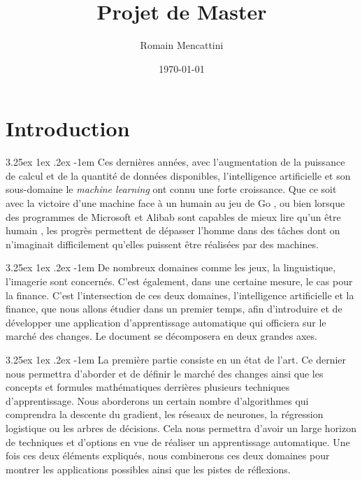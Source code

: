 \documentclass[a4paper, 11pt]{article}
\title{Projet de Master}
\author{Romain Mencattini}
\date{\today}
\makeatletter
\renewcommand\paragraph{\@startsection{paragraph}{5}{\z@}%
  {3.25ex \@plus1ex \@minus.2ex}%
  {-1em}%
  {\normalfont\normalsize\bfseries}}
\makeatother
\begin{document}
\maketitle
\newpage
\tableofcontents
\newpage

\section{Introduction}
\paragraph{}
Ces dernières années, avec l'augmentation de la puissance de calcul et de la quantité de données disponibles, l'intelligence artificielle et son sous-domaine le \textit{machine learning} ont connu une forte croissance. Que ce soit avec la victoire d'une machine face à un humain au jeu de Go \cite{deepmind}, ou bien lorsque des programmes de Microsoft et Alibab sont capables de mieux lire qu'un être humain \cite{microsoft_reading}, les progrès permettent de dépasser l'homme dans des tâches dont on n'imaginait difficilement qu'elles puissent être réalisées par des machines.

\paragraph{}
De nombreux domaines comme les jeux, la linguistique, l'imagerie sont concernés. C'est également, dans une certaine mesure, le cas pour la finance.
C'est l'intersection de ces deux domaines, l'intelligence artificielle et la finance, que nous allons étudier dans un premier temps, afin d'introduire et de développer une application d'apprentissage automatique qui officiera sur le marché des changes.
Le document se décomposera en deux grandes axes. 

\paragraph{}
La première partie consiste en un état de l'art. Ce dernier nous permettra d'aborder et de définir le marché des changes ainsi que les concepts et formules mathématiques derrières plusieurs techniques d'apprentissage. Nous aborderons un certain nombre d'algorithmes qui comprendra la descente du gradient, les réseaux de neurones, la régression logistique ou les arbres de décisions. Cela nous permettra d'avoir un large horizon de techniques et d'options en vue de réaliser un apprentissage automatique. Une fois ces deux éléments expliqués, nous combinerons ces deux domaines pour montrer les applications possibles ainsi que les pistes de réflexions.
\end{document}
